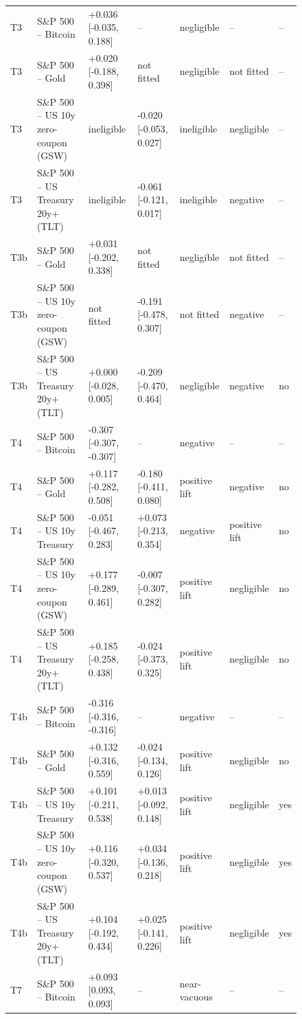 \begin{figure}[t]
{\begin{tabular}{lllllll}
T3 & S\&P 500 -- Bitcoin & +0.036 [-0.035, 0.188] & -- & negligible & -- & -- \\
T3 & S\&P 500 -- Gold & +0.020 [-0.188, 0.398] & not fitted & negligible & not fitted & -- \\
T3 & S\&P 500 -- US 10y zero-coupon (GSW) & ineligible & -0.020 [-0.053, 0.027] & ineligible & negligible & -- \\
T3 & S\&P 500 -- US Treasury 20y+ (TLT) & ineligible & -0.061 [-0.121, 0.017] & ineligible & negative & -- \\
T3b & S\&P 500 -- Gold & +0.031 [-0.202, 0.338] & not fitted & negligible & not fitted & -- \\
T3b & S\&P 500 -- US 10y zero-coupon (GSW) & not fitted & -0.191 [-0.478, 0.307] & not fitted & negative & -- \\
T3b & S\&P 500 -- US Treasury 20y+ (TLT) & +0.000 [-0.028, 0.005] & -0.209 [-0.470, 0.464] & negligible & negative & no \\
T4 & S\&P 500 -- Bitcoin & -0.307 [-0.307, -0.307] & -- & negative & -- & -- \\
T4 & S\&P 500 -- Gold & +0.117 [-0.282, 0.508] & -0.180 [-0.411, 0.080] & positive lift & negative & no \\
T4 & S\&P 500 -- US 10y Treasury & -0.051 [-0.467, 0.283] & +0.073 [-0.213, 0.354] & negative & positive lift & no \\
T4 & S\&P 500 -- US 10y zero-coupon (GSW) & +0.177 [-0.289, 0.461] & -0.007 [-0.307, 0.282] & positive lift & negligible & no \\
T4 & S\&P 500 -- US Treasury 20y+ (TLT) & +0.185 [-0.258, 0.438] & -0.024 [-0.373, 0.325] & positive lift & negligible & no \\
T4b & S\&P 500 -- Bitcoin & -0.316 [-0.316, -0.316] & -- & negative & -- & -- \\
T4b & S\&P 500 -- Gold & +0.132 [-0.316, 0.559] & -0.024 [-0.134, 0.126] & positive lift & negligible & no \\
T4b & S\&P 500 -- US 10y Treasury & +0.101 [-0.211, 0.538] & +0.013 [-0.092, 0.148] & positive lift & negligible & yes \\
T4b & S\&P 500 -- US 10y zero-coupon (GSW) & +0.116 [-0.320, 0.537] & +0.034 [-0.136, 0.218] & positive lift & negligible & yes \\
T4b & S\&P 500 -- US Treasury 20y+ (TLT) & +0.104 [-0.192, 0.434] & +0.025 [-0.141, 0.226] & positive lift & negligible & yes \\
T7 & S\&P 500 -- Bitcoin & +0.093 [0.093, 0.093] & -- & near-vacuous & -- & -- \\

\end{tabular}}
\end{figure}
